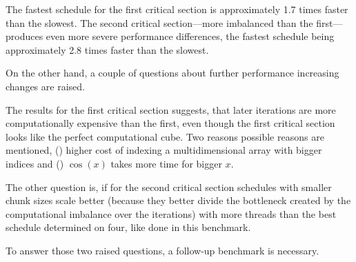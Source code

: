 \documentclass[twoside,11pt]{article}
\begin{document}
The fastest schedule for the first critical section is
approximately 1.7 times faster than the slowest.
The second critical section---more imbalanced than the
first---produces even more severe performance differences,
the fastest schedule being approximately 2.8 times faster
than the slowest.

On the other hand, a couple of questions about further
performance increasing changes are raised.

The results for the first critical section suggests, that
later iterations are more computationally expensive than
the first, even though the first critical section looks
like the perfect computational cube.
Two reasons possible reasons are mentioned,
() higher cost of indexing a
multidimensional array with bigger indices and
() $\cos(x)$ takes more time for bigger $x$.

The other question is, if for the second critical section
schedules with smaller chunk sizes scale better (because
they better divide the bottleneck created by the
computational imbalance over the iterations) with more
threads than the best schedule determined on four, like
done in this benchmark.

To answer those two raised questions, a follow-up benchmark
is necessary.



\end{document}
